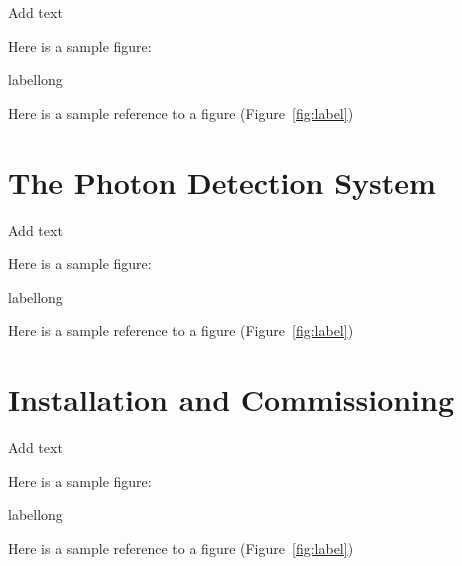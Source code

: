 Add text

Here is a sample figure: 

\begin{cdrfigure}[short]{label}{long}
\end{cdrfigure}


Here is a sample reference to a figure (Figure~\ref{fig:label})


\section{The Photon Detection System}
\label{sec:detectors-fd-ref-pd}

Add text

Here is a sample figure: 

\begin{cdrfigure}[short]{label}{long}
\end{cdrfigure}


Here is a sample reference to a figure (Figure~\ref{fig:label})

\section{Installation and Commissioning}
\label{sec:detectors-fd-ref-install}

Add text

Here is a sample figure: 

\begin{cdrfigure}[short]{label}{long}
\end{cdrfigure}


Here is a sample reference to a figure (Figure~\ref{fig:label})
